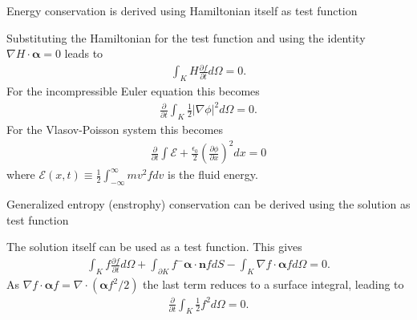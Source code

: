 \documentclass[pdf]{beamer}
\newcommand{\pfrac}[2]{\frac{\partial #1}{\partial #2}}
\newcommand{\pfraca}[1]{\frac{\partial}{\partial #1}}
\newcommand{\mvec}[1]{\mathbf{#1}}
\newcommand{\gvec}[1]{\boldsymbol{#1}}
\theoremstyle{definition}
\begin{document}
\begin{frame}{Energy conservation is derived using Hamiltonian itself
    as test function}%

  Substituting the Hamiltonian for the test function and using the
  identity $\nabla H \cdot \gvec{\alpha} = 0$ leads to
  \begin{align*}
    \int_K H \pfrac{f}{t}d\Omega = 0.
  \end{align*}
  For the incompressible Euler equation this becomes
  \begin{align*}
    \pfraca{t}\int_K \frac{1}{2} |\nabla\phi|^2  d\Omega = 0.
  \end{align*}
  For the Vlasov-Poisson system this becomes
  \begin{align*}
    \pfraca{t}\int \mathcal{E} +
    \frac{\epsilon_0}{2}\left(\pfrac{\phi}{x}\right)^2 dx = 0
  \end{align*}
  where $\mathcal{E}(x,t) \equiv \frac{1}{2}\int_{-\infty}^{\infty}
  mv^2f dv$ is the fluid energy.

\end{frame}

\begin{frame}{Generalized entropy (enstrophy) conservation can be
    derived using the solution as test function}%

  The solution itself can be used as a test function. This gives
  \begin{align*}
    \int_K f\pfrac{f}{t}d\Omega 
    + \int_{\partial K}f^- \gvec{\alpha}\cdot\mvec{n}f dS
    - \int_K \nabla f \cdot \gvec{\alpha} f d\Omega
    = 0.
  \end{align*}
  As $\nabla f \cdot \gvec{\alpha} f = \nabla\cdot (\gvec{\alpha}
  f^2/2)$ the last term reduces to a surface integral, leading to
  \begin{align*}
    \pfraca{t}\int_K \frac{1}{2}f^2 d\Omega = 0.
  \end{align*}

\end{frame}
\end{document}
